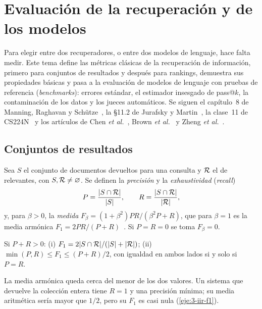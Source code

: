 \chapter{Evaluación de la recuperación y de los modelos}
\label{tema:3}

Para elegir entre dos recuperadores, o entre dos modelos de lenguaje, hace falta medir. Este tema define las métricas clásicas de la recuperación de información, primero para conjuntos de resultados y después para rankings, demuestra sus propiedades básicas y pasa a la evaluación de modelos de lenguaje con pruebas de referencia (\emph{benchmarks}): errores estándar, el estimador insesgado de pass@$k$, la contaminación de los datos y los jueces automáticos. Se siguen el capítulo~8 de Manning, Raghavan y Schütze~\cite{iir}, la §11.2 de Jurafsky y Martin~\cite{jm3}, la clase~11 de CS224N~\cite{cs224n} y los artículos de Chen \emph{et al.}~\cite{chen-codex}, Brown \emph{et al.}~\cite{brown} y Zheng \emph{et al.}~\cite{zheng}.

\section{Conjuntos de resultados}

\begin{definicion}\label{def:pr}
Sea $S$ el conjunto de documentos devueltos para una consulta y $\mathcal{R}$ el de relevantes, con $S,\mathcal{R}\ne\varnothing$. Se definen la \emph{precisión} y la \emph{exhaustividad} (\emph{recall})
\[
P=\frac{\lvert S\cap\mathcal{R}\rvert}{\lvert S\rvert},\qquad R=\frac{\lvert S\cap\mathcal{R}\rvert}{\lvert\mathcal{R}\rvert},
\]
y, para $\beta>0$, la \emph{medida} $F_\beta=(1+\beta^{2})PR/(\beta^{2}P+R)$, que para $\beta=1$ es la media armónica $F_1=2PR/(P+R)$~\cite[§8.3]{iir}. Si $P=R=0$ se toma $F_\beta=0$.
\end{definicion}

\begin{proposicion}[Propiedades de $F_1$]\label{prop:f1}
Si $P+R>0$: (i) $F_1=2\lvert S\cap\mathcal{R}\rvert/(\lvert S\rvert+\lvert\mathcal{R}\rvert)$; (ii) $\min(P,R)\le F_1\le (P+R)/2$, con igualdad en ambos lados si y solo si $P=R$.
\end{proposicion}

La media armónica queda cerca del menor de los dos valores. Un sistema que devuelve la colección entera tiene $R=1$ y una precisión mínima; su media aritmética sería mayor que $1/2$, pero su $F_1$ es casi nula (\cref{eje:3-iir-f1}).

